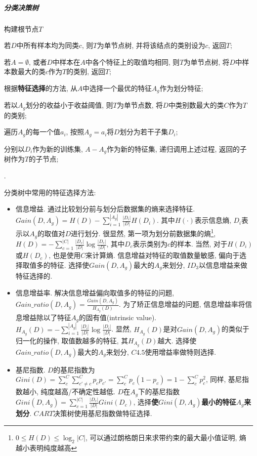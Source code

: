 \subparagraph{分类决策树}
\begin{myenumerate}
\item 构建根节点$T$
\item 若$D$中所有样本均为同类$c$, 则$T$为单节点树, 并将该结点的类别设为$c$, 返回$T$; 
\item 若$A = \emptyset$, 或者$D$中样本在$A$中各个特征上的取值均相同, 则$T$为单节点树, 将$D$中样本数最大的类$c$作为$T$的类别, 返回$T$; 
\item 根据\textbf{特征选择}的方法, 从$A$中选择一个最优的特征$A_g$作为划分特征; 
\item 若以$A_g$划分的收益小于收益阈值, 则$T$为单节点数, 将$D$中类别数最大的类$C$作为$T$的类别; 
\item 遍历$A_g$的每一个值$a_i$, 按照$A_g = a_i$将$D$划分为若干子集$D_i$; 
\item 分别以$D_i$作为新的训练集, $A - {A_g}$作为新的特征集, 递归调用上述过程, 返回的子树作为$T$的子节点; 
\end{myenumerate}

. 

分类树中常用的特征选择方法: 
\begin{itemize}
\item 信息增益. 通过比较划分前与划分后数据集的熵来选择特征. $Gain(D, A_g) = H(D) - \sum_{i=1}^{|A_g|} \frac{|D_i|}{|D|} H(D_i)$. 其中$H(\cdot)$表示信息熵, $D_i$表示以$A_g$的取值对$D$进行划分. 很显然, 第一项为划分前数据集的熵\footnote{$0 \leq H(D) \leq \log_2 |C|$, 可以通过朗格朗日来求带约束的最大最小值证明, 熵越小表明纯度越高}, $H(D) = -\sum_{c=1}^{|C|} \frac{|D_c|}{|D|} \log \frac{|D_c|}{|D|}$, 其中$D_c$表示类别为$c$的样本. 当然, 对于$H(D_i)$或$H(D_c)$, 也是使用$C$来计算熵. 信息增益对特征的取值数量敏感, 偏向于选择取值多的特征. 选择使$Gain(D, A_g)$最大的$A_g$来划分, $ID_3$以信息增益来做特征选择的. 
\item 信息增益率. 解决信息增益偏向取值多的特征的问题, $Gain\_ratio(D, A_g) = \frac{Gain(D, A_g)}{H_{A_g}(D)}$. 为了矫正信息增益的问题, 信息增益率将信息增益除以了特征$A_g$的固有值(intrinsic value). $H_{A_g}(D) = -\sum_{i=1}^{|A_g|} \frac{|D_i|}{|D|} \log \frac{|D_i|}{|D|}$. 显然, $H_{A_g}(D)$是对$Gain(D, A_g)$的类似于归一化的操作, 取值数越多的特征, 其$H_{A_g}(D)$越大. 选择使$Gain\_ratio(D, A_g)$最大的$A_g$来划分, $C4.5$使用增益率做特则选择. 
\item 基尼指数. $D$的基尼指数为$Gini(D) = \sum_{c}^{C} \sum_{c' \neq c}^{C} p_c p_{c'} = \sum_{c}^{C} p_c (1 - p_c) = 1 - \sum_{c}^{C} p_c^2$, 同样, 基尼指数越小, 纯度越高/不确定性越低. $D$在$A_g$下的基尼指数$Gini(D, A_g) = \sum_{c=1}^{|C|} \frac{|D_c|}{|D|} Gini(D_c)$, 选择\textbf{使$Gini(D, A_g)$最小的特征$A_g$来划分}. $CART$决策树使用基尼指数做特征选择. 
\end{itemize}

